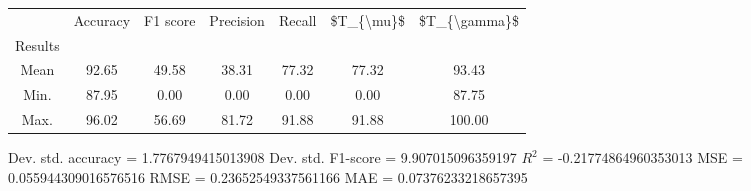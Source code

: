 \begin{tabular}{|c|c|c|c|c|c|c|}
\toprule
{} &  Accuracy &  F1 score &  Precision &  Recall &  \$T\_\{\textbackslash mu\}\$ &  \$T\_\{\textbackslash gamma\}\$ \\
Results &           &           &            &         &            &               \\
\hline
Mean    &     92.65 &     49.58 &      38.31 &   77.32 &      77.32 &         93.43 \\
Min.    &     87.95 &      0.00 &       0.00 &    0.00 &       0.00 &         87.75 \\
Max.    &     96.02 &     56.69 &      81.72 &   91.88 &      91.88 &        100.00 \\
\bottomrule
\end{tabular}

 Dev. std. accuracy = 1.7767949415013908
 Dev. std. F1-score = 9.907015096359197
 $R^2$ = -0.21774864960353013
 MSE = 0.055944309016576516
 RMSE = 0.23652549337561166
 MAE = 0.07376233218657395